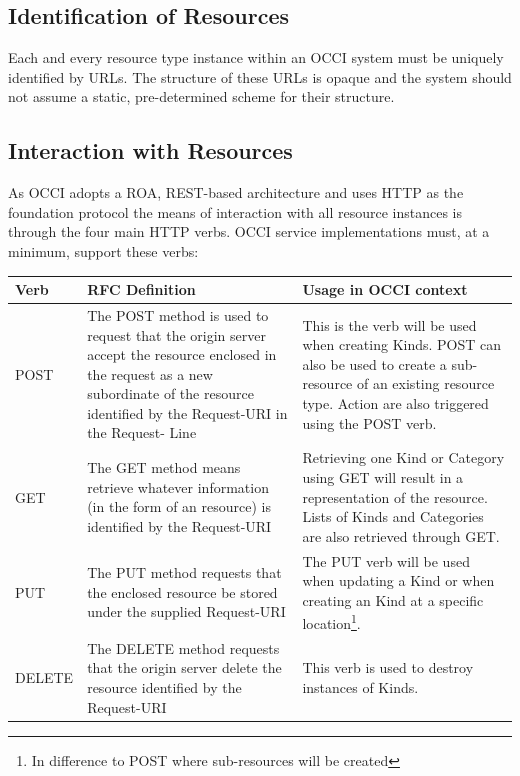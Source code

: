 \documentclass[10pt,a4paper]{article}
\begin{document}
\subsection{Identification of Resources}
Each and every resource type instance within an OCCI system must be uniquely identified by URLs. The structure of these URLs is opaque and the system should not assume a static, pre-determined scheme for their structure.

\subsection{Interaction with Resources}
As OCCI adopts a ROA, REST-based architecture and uses HTTP as the foundation protocol the means of interaction with all resource instances is through the four main HTTP verbs. OCCI service implementations must, at a minimum, support these verbs:

\begin{tabular}{l|p{3.2in}|p{2in}}
Verb & RFC Definition & Usage in OCCI context \\
\hline
POST & The POST method is used to request that the origin server accept the resource enclosed in the request as a new subordinate of the resource identified by the Request-URI in the Request- Line & This is the verb will be used when creating Kinds. POST can also be used to create a sub-resource of an existing resource type. Action are also triggered using the POST verb. \\
GET & The GET method means retrieve whatever information (in the form of an resource) is identified by the Request-URI & Retrieving one Kind or Category using GET will result in a representation of the resource. Lists of Kinds and Categories are also retrieved through GET. \\
PUT & The PUT method requests that the enclosed resource be stored under the supplied Request-URI & The PUT verb will be used when updating a Kind or when creating an Kind at a specific location\footnote{In difference to POST where sub-resources will be created}. \\
DELETE & The DELETE method requests that the origin server delete the resource identified by the Request-URI & This verb is used to destroy instances of Kinds. \\ 
\end{tabular}
\end{document}
